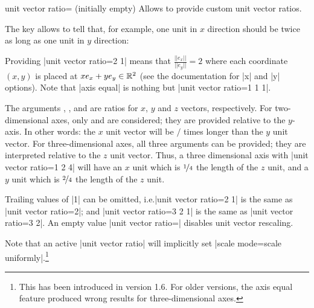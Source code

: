 \begin{pgfplotskey}{unit vector ratio= (initially empty)}
    Allows to provide custom unit vector ratios.

    The key allows to tell \PGFPlots{} that, for example, one unit in $x$
    direction should be twice as long as one unit in $y$ direction:
\begin{codeexample}[]
\end{codeexample}
    \noindent Providing |unit vector ratio=2 1| means that
    $\frac{||e_x||}{||e_y||} = 2$ where each coordinate $(x,y)$ is placed at $x
    e_x + y e_y \in \mathbb{R}^2$ (see the documentation for |x| and |y| options). Note
    that |axis equal| is nothing but |unit vector ratio=1 1 1|.

    The arguments , , and  are ratios for $x$, $y$
    and $z$ vectors, respectively. For two-dimensional axes, only  and
     are considered; they are provided relative to the $y$-axis. In
    other words: the $x$ unit vector will be $/$ times
    longer than the $y$ unit vector. For three-dimensional axes, all three
    arguments can be provided; they are interpreted relative to the $z$ unit
    vector. Thus, a three dimensional axis with |unit vector ratio=1 2 4| will
    have an $x$ unit which is $\nicefrac 14$ the length of the $z$ unit, and a
    $y$ unit which is $\nicefrac24$ the length of the $z$ unit.

    Trailing values of |1| can be omitted, i.e.\@ |unit vector ratio=2 1| is
    the same as |unit vector ratio=2|; and |unit vector ratio=3 2 1| is the
    same as |unit vector ratio=3 2|. An empty value |unit vector ratio={}|
    disables unit vector rescaling.

    Note that an active |unit vector ratio| will implicitly set
    |scale mode=scale uniformly|.\footnote{This has been introduced in version
    1.6. For older versions, the axis equal feature produced wrong results for
    three-dimensional axes.}


\end{pgfplotskey}
